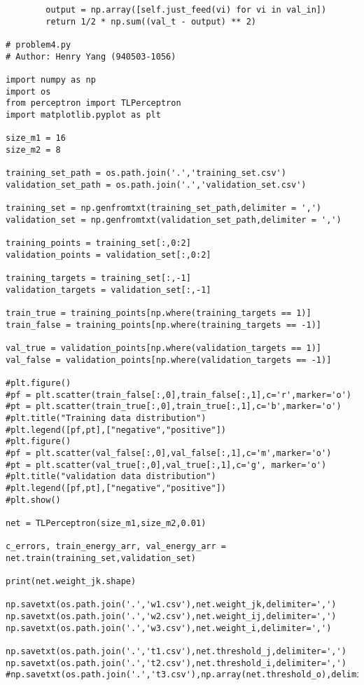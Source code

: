 \documentclass{article}
\begin{document}
\begin{verbatim}
        output = np.array([self.just_feed(vi) for vi in val_in])
        return 1/2 * np.sum((val_t - output) ** 2)

# problem4.py
# Author: Henry Yang (940503-1056)

import numpy as np
import os
from perceptron import TLPerceptron
import matplotlib.pyplot as plt

size_m1 = 16
size_m2 = 8

training_set_path = os.path.join('.','training_set.csv')
validation_set_path = os.path.join('.','validation_set.csv')

training_set = np.genfromtxt(training_set_path,delimiter = ',')
validation_set = np.genfromtxt(validation_set_path,delimiter = ',')

training_points = training_set[:,0:2]
validation_points = validation_set[:,0:2]

training_targets = training_set[:,-1]
validation_targets = validation_set[:,-1]

train_true = training_points[np.where(training_targets == 1)]
train_false = training_points[np.where(training_targets == -1)]

val_true = validation_points[np.where(validation_targets == 1)]
val_false = validation_points[np.where(validation_targets == -1)]

#plt.figure()
#pf = plt.scatter(train_false[:,0],train_false[:,1],c='r',marker='o')
#pt = plt.scatter(train_true[:,0],train_true[:,1],c='b',marker='o')
#plt.title("Training data distribution")
#plt.legend([pf,pt],["negative","positive"])
#plt.figure()
#pf = plt.scatter(val_false[:,0],val_false[:,1],c='m',marker='o')
#pt = plt.scatter(val_true[:,0],val_true[:,1],c='g', marker='o')
#plt.title("validation data distribution")
#plt.legend([pf,pt],["negative","positive"])
#plt.show()

net = TLPerceptron(size_m1,size_m2,0.01)

c_errors, train_energy_arr, val_energy_arr = net.train(training_set,validation_set)

print(net.weight_jk.shape)

np.savetxt(os.path.join('.','w1.csv'),net.weight_jk,delimiter=',')
np.savetxt(os.path.join('.','w2.csv'),net.weight_ij,delimiter=',')
np.savetxt(os.path.join('.','w3.csv'),net.weight_i,delimiter=',')

np.savetxt(os.path.join('.','t1.csv'),net.threshold_j,delimiter=',')
np.savetxt(os.path.join('.','t2.csv'),net.threshold_i,delimiter=',')
#np.savetxt(os.path.join('.','t3.csv'),np.array(net.threshold_o),delimiter=',')


\end{verbatim}
\end{document}
